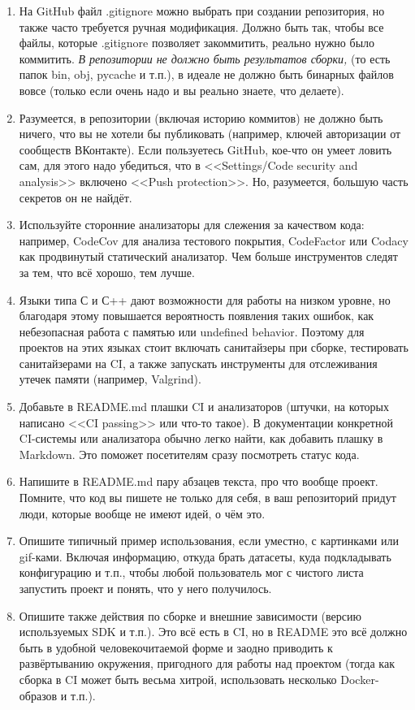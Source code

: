 \documentclass[a5paper]{article}
\begin{document}
\begin{enumerate}
\begin{itemize}
    \end{itemize}
    \item На GitHub файл .gitignore можно выбрать при создании репозитория, но также часто требуется ручная модификация. Должно быть так, чтобы все файлы, которые .gitignore позволяет закоммитить, реально нужно было коммитить. \emph{В репозитории не должно быть результатов сборки,} (то есть папок bin, obj, pycache и т.п.), в идеале не должно быть бинарных файлов вовсе (только если очень надо и вы реально знаете, что делаете).
    \item Разумеется, в репозитории (включая историю коммитов) не должно быть ничего, что вы не хотели бы публиковать (например, ключей авторизации от сообществ ВКонтакте). Если пользуетесь GitHub, кое-что он умеет ловить сам, для этого надо убедиться, что в <<Settings/Code security and analysis>> включено <<Push protection>>. Но, разумеется, большую часть секретов он не найдёт.
    \item Используйте сторонние анализаторы для слежения за качеством кода: например, CodeCov для анализа тестового покрытия, CodeFactor или Codacy как продвинутый статический анализатор. Чем больше инструментов следят за тем, что всё хорошо, тем лучше.
    \item Языки типа С и С++ дают возможности для работы на низком уровне, но благодаря этому повышается вероятность появления таких ошибок, как небезопасная работа с памятью или undefined behavior. Поэтому для проектов на этих языках стоит включать санитайзеры при сборке, тестировать санитайзерами на CI, а также запускать инструменты для отслеживания утечек памяти (например, Valgrind).
    \item Добавьте в README.md плашки CI и анализаторов (штучки, на которых написано <<CI passing>> или что-то такое). В документации конкретной CI-системы или анализатора обычно легко найти, как добавить плашку в Markdown. Это поможет посетителям сразу посмотреть статус кода.
    \item Напишите в README.md пару абзацев текста, про что вообще проект. Помните, что код вы пишете не только для себя, в ваш репозиторий придут люди, которые вообще не имеют идей, о чём это.
    \item Опишите типичный пример использования, если уместно, с картинками или gif-ками. Включая информацию, откуда брать датасеты, куда подкладывать конфигурацию и т.п., чтобы любой пользователь мог с чистого листа запустить проект и понять, что у него получилось.
    \item Опишите также действия по сборке и внешние зависимости (версию используемых SDK и т.п.). Это всё есть в CI, но в README это всё должно быть в удобной человекочитаемой форме и заодно приводить к развёртыванию окружения, пригодного для работы над проектом (тогда как сборка в CI может быть весьма хитрой, использовать несколько Docker-образов и т.п.).

\end{enumerate}
\end{document}
